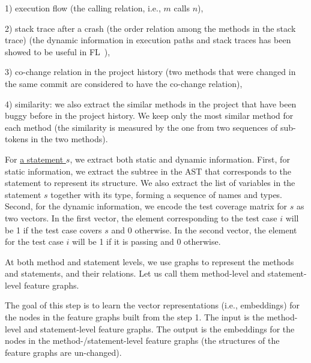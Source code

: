 1) execution flow (the calling relation, i.e., $m$ calls $n$),

2) stack trace after a crash (the order relation among the methods in
the stack trace) (the dynamic information in execution paths and stack
traces has been showed to be useful in FL~\cite{icse21-fl,DeepFL}),

3) co-change relation in the project history (two methods that were
changed in the same commit are considered to have the co-change
relation),

4) similarity: we also extract the similar methods in the project that
have been buggy before in the project history. We keep only the most
similar method for each method (the similarity is measured by the one
from two sequences of sub-tokens in the two methods).

For \underline{a statement $s$}, we extract both static and dynamic
information. First, for static information, we extract the subtree in
the AST that corresponds to the statement to represent its
structure. We also extract the list of variables in the statement $s$
together with its type, forming a sequence of names and types. Second,
for the dynamic information, we encode the test coverage matrix for
$s$ as two vectors. In the first vector, the element corresponding to
the test case $i$ will be 1 if the test case covers $s$ and 0
otherwise. In the second vector, the element for the test case $i$
will be 1 if it is passing and 0 otherwise.

At both method and statement levels, we use graphs to represent
the methods and statements, and their relations. Let us call
them method-level and statement-level feature graphs.

\vspace{3pt}
The goal of this step is to learn the vector representations
(i.e., embeddings) for the nodes in the feature graphs built from the
step 1. The input is the method-level and statement-level feature
graphs. The output is the embeddings for the nodes in the
method-/statement-level feature graphs (the structures of the feature
graphs are un-changed).


